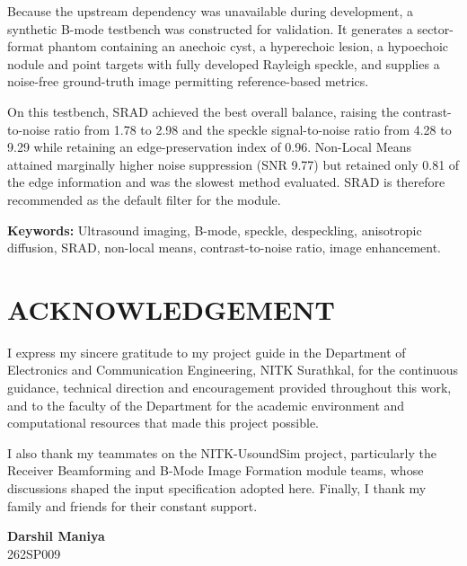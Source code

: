 \documentclass[12pt,a4paper,oneside]{report}
\begin{document}
Because the upstream dependency was unavailable during development, a synthetic
B-mode testbench was constructed for validation. It generates a sector-format
phantom containing an anechoic cyst, a hyperechoic lesion, a hypoechoic nodule
and point targets with fully developed Rayleigh speckle, and supplies a noise-free
ground-truth image permitting reference-based metrics.

On this testbench, SRAD achieved the best overall balance, raising the
contrast-to-noise ratio from 1.78 to 2.98 and the speckle signal-to-noise ratio
from 4.28 to 9.29 while retaining an edge-preservation index of 0.96. Non-Local
Means attained marginally higher noise suppression (SNR 9.77) but retained only
0.81 of the edge information and was the slowest method evaluated. SRAD is
therefore recommended as the default filter for the module.

\vspace{0.5cm}
\textbf{Keywords:} Ultrasound imaging, B-mode, speckle, despeckling, anisotropic
diffusion, SRAD, non-local means, contrast-to-noise ratio, image enhancement.

\chapter*{ACKNOWLEDGEMENT}
\thispagestyle{plain}

I express my sincere gratitude to my project guide in the Department of
Electronics and Communication Engineering, NITK Surathkal, for the continuous
guidance, technical direction and encouragement provided throughout this work, and
to the faculty of the Department for the academic environment and computational
resources that made this project possible.

I also thank my teammates on the NITK-UsoundSim project, particularly the Receiver
Beamforming and B-Mode Image Formation module teams, whose discussions shaped the
input specification adopted here. Finally, I thank my family and friends for their
constant support.

\vspace{1.2cm}
\begin{flushright}
\textbf{Darshil Maniya}\\
262SP009
\end{flushright}

\clearpage
\begingroup
\small
\setcounter{tocdepth}{1}
\tableofcontents
{}
\endgroup
\end{document}
